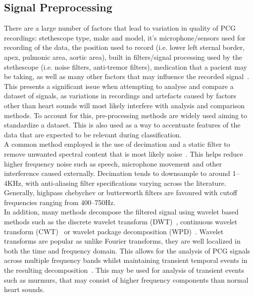 \documentclass[titlepage, 12pt]{scrartcl} \usepackage{enumitem}
\begin{document}
\subsection{Signal Preprocessing}
There are a large number of factors that lead to variation in quality of PCG
recordings: stethescope type, make and model, it's microphone/sensors used for
recording of the data, the position used to record (i.e.  lower left sternal
border, apex, pulmonic area, aortic area), built in filters/signal processing 
used by the stethescope (i.e. noise filters, anti-tremor filters), medication that
a pacient may be taking, as well as many other factors that may influence the
recorded signal~\parencite[p.4]{Pavlopoulos2004}. This presents a significant
issue when attempting to analyse and compare a dataset of signals, as
variations in recordings and artefacts caused by factors other than heart
sounds will most likely interfere with analysis and comparison methods. To
account for this, pre-processing methods are widely used aiming to standardize
a dataset. This is also used as a way to accentuate features of the data that
are expected to be relevant during classification.\\

A common method employed is the use of decimation and a static filter to remove
unwanted spectral content that is most likely noise~\parencite{Liang1997a,
Homsi2016, Springer2016, Gupta2007}. This helps reduce higher frequency noise
such as speech, microphone movement and other interference caused externally.
Decimation tends to downsample to around 1--4KHz, with anti-aliasing filter
specifications varying across the literature. Generally, highpass chebychev or
butterworth filters are favoured with cutoff frequencies ranging from
400--750Hz.\\

In addition, many methods decompose the filtered signal using wavelet based
methods such as the discrete wavelet transform
(DWT)~\parencite{Liang1997a, Pavlopoulos2004}, continuous
wavelet transform (CWT)~\parencite{Langley2016} or wavelet
package decomposition (WPD)~\parencite{Liang1998}.
Wavelet transforms are popular as unlike Fourier transforms, they are well
localized in both the time and frequency domain. This allows for the analysis
of PCG signals across multiple frequency bands whilst maintaining transient
temporal events in the resulting decomposition~\parencite[p.93]{Ari2008}.
This may be used for analysis of transient events such as murmurs, that may
consist of higher frequency components than normal heart sounds.
\end{document}
